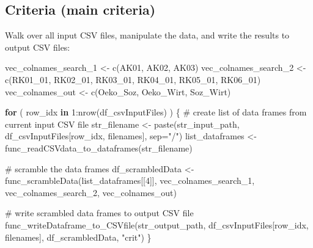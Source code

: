 \documentclass[
]{article}
\newenvironment{Shaded}{\begin{snugshade}}{\end{snugshade}}
\newcommand{\AttributeTok}[1]{\textcolor[rgb]{0.00,0.34,0.68}{#1}}
\newcommand{\CommentTok}[1]{\textcolor[rgb]{0.54,0.53,0.53}{#1}}
\newcommand{\ControlFlowTok}[1]{\textcolor[rgb]{0.12,0.11,0.11}{\textbf{#1}}}
\newcommand{\DecValTok}[1]{\textcolor[rgb]{0.69,0.50,0.00}{#1}}
\newcommand{\FunctionTok}[1]{\textcolor[rgb]{0.39,0.29,0.61}{#1}}
\newcommand{\NormalTok}[1]{\textcolor[rgb]{0.12,0.11,0.11}{#1}}
\newcommand{\OtherTok}[1]{\textcolor[rgb]{0.00,0.43,0.16}{#1}}
\newcommand{\SpecialCharTok}[1]{\textcolor[rgb]{0.24,0.68,0.91}{#1}}
\newcommand{\StringTok}[1]{\textcolor[rgb]{0.75,0.01,0.01}{#1}}
\begin{document}
\hypertarget{criteria-main-criteria}{%
\subsection{Criteria (main criteria)}\label{criteria-main-criteria}}

Walk over all input CSV files, manipulate the data, and write the
results to output CSV files:

\begin{Shaded}
\begin{Highlighting}[]
\NormalTok{vec\_colnames\_search\_1 }\OtherTok{\textless{}{-}} \FunctionTok{c}\NormalTok{(}\StringTok{\textquotesingle{}AK01\textquotesingle{}}\NormalTok{, }\StringTok{\textquotesingle{}AK02\textquotesingle{}}\NormalTok{, }\StringTok{\textquotesingle{}AK03\textquotesingle{}}\NormalTok{)}
\NormalTok{vec\_colnames\_search\_2 }\OtherTok{\textless{}{-}} \FunctionTok{c}\NormalTok{(}\StringTok{\textquotesingle{}RK01\_01\textquotesingle{}}\NormalTok{, }\StringTok{\textquotesingle{}RK02\_01\textquotesingle{}}\NormalTok{, }\StringTok{\textquotesingle{}RK03\_01\textquotesingle{}}\NormalTok{, }\StringTok{\textquotesingle{}RK04\_01\textquotesingle{}}\NormalTok{, }\StringTok{\textquotesingle{}RK05\_01\textquotesingle{}}\NormalTok{, }\StringTok{\textquotesingle{}RK06\_01\textquotesingle{}}\NormalTok{)}
\NormalTok{vec\_colnames\_out }\OtherTok{\textless{}{-}} \FunctionTok{c}\NormalTok{(}\StringTok{\textquotesingle{}Oeko\_Soz\textquotesingle{}}\NormalTok{, }\StringTok{\textquotesingle{}Oeko\_Wirt\textquotesingle{}}\NormalTok{, }\StringTok{\textquotesingle{}Soz\_Wirt\textquotesingle{}}\NormalTok{)}

\ControlFlowTok{for}\NormalTok{ ( row\_idx }\ControlFlowTok{in} \DecValTok{1}\SpecialCharTok{:}\FunctionTok{nrow}\NormalTok{(df\_csvInputFiles) ) \{}
  \CommentTok{\# create list of data frames from current input CSV file}
\NormalTok{  str\_filename }\OtherTok{\textless{}{-}} \FunctionTok{paste}\NormalTok{(str\_input\_path, df\_csvInputFiles[row\_idx, filenames], }\AttributeTok{sep=}\StringTok{"/"}\NormalTok{)}
\NormalTok{  list\_dataframes }\OtherTok{\textless{}{-}} \FunctionTok{func\_readCSVdata\_to\_dataframes}\NormalTok{(str\_filename)}
  
  \CommentTok{\# scramble the data frames}
\NormalTok{  df\_scrambledData }\OtherTok{\textless{}{-}} \FunctionTok{func\_scrambleData}\NormalTok{(list\_dataframes[[}\DecValTok{4}\NormalTok{]], vec\_colnames\_search\_1, vec\_colnames\_search\_2, vec\_colnames\_out)}
  
  \CommentTok{\# write scrambled data frames to output CSV file}
  \FunctionTok{func\_writeDataframe\_to\_CSVfile}\NormalTok{(str\_output\_path, df\_csvInputFiles[row\_idx, filenames], df\_scrambledData, }\StringTok{"crit"}\NormalTok{)}
\NormalTok{\}}
\end{Highlighting}
\end{Shaded}
\end{document}
